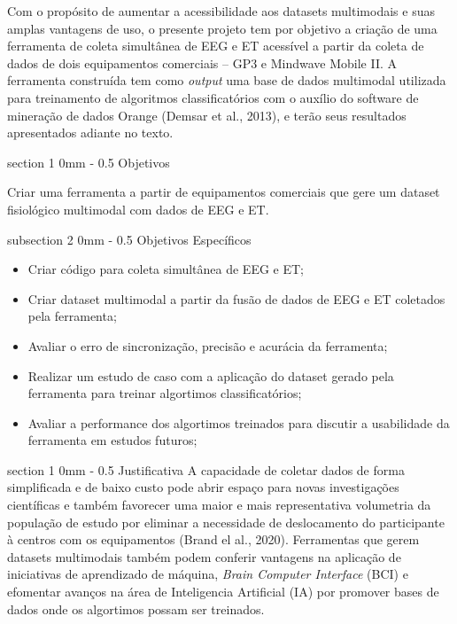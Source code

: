 \documentclass[a4paper, 12pt]{ppgeb}
\makeatletter
\renewcommand{\section}{\@startsection
{section}
{1}
{0mm}
{-\baselineskip}
{0.5\baselineskip}
{\large\bfseries\scshape}}
\renewcommand{\subsection}{\@startsection
{subsection}
{2}
{0mm}
{-\baselineskip}
{0.5\baselineskip}
{\bf\sffamily}}
\makeatother
\begin{document}
Com o propósito de aumentar a acessibilidade aos datasets multimodais e suas amplas vantagens de uso, 
o presente projeto tem por objetivo a criação de uma ferramenta de coleta simultânea de EEG e ET acessível a 
partir da coleta de dados de dois equipamentos comerciais – GP3 e Mindwave Mobile II. A ferramenta construída tem como \textit{output} uma base de dados multimodal
 utilizada para treinamento de algoritmos classificatórios com o auxílio do software de mineração de dados Orange (Demsar et al., 2013), e terão seus resultados apresentados
 adiante no texto.


\section{Objetivos}

Criar uma ferramenta a partir de equipamentos comerciais que gere um dataset fisiológico multimodal com dados de EEG e ET.

\subsection{Objetivos Específicos}

\begin{itemize}
    \item Criar código para coleta simultânea de EEG e ET;
    \item Criar dataset multimodal a partir da fusão de dados de EEG e ET coletados pela ferramenta;
    \item Avaliar o erro de sincronização, precisão e acurácia da ferramenta;
    \item Realizar um estudo de caso com a aplicação do dataset gerado pela ferramenta para treinar algortimos classificatórios;
    \item Avaliar a performance dos algortimos treinados para discutir a usabilidade da ferramenta em estudos futuros;
\end{itemize}


\section{Justificativa}
A capacidade de coletar dados de forma simplificada e de baixo custo pode abrir espaço para novas investigações 
científicas e também favorecer uma maior e mais representativa volumetria da população de estudo por eliminar a necessidade
de deslocamento do participante à centros com os equipamentos (Brand el al., 2020). Ferramentas que gerem
datasets multimodais também podem conferir vantagens na aplicação de iniciativas de aprendizado de máquina, \textit{Brain Computer Interface} (BCI) 
e efomentar avanços na área de Inteligencia Artificial (IA) por promover bases de dados onde os algortimos possam ser treinados. 
\end{document}
